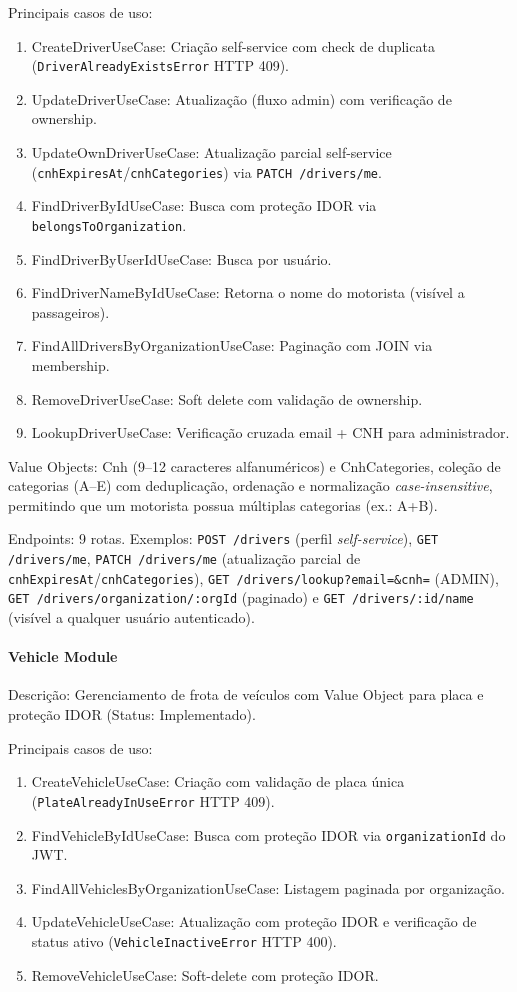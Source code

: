Principais casos de uso:
\begin{enumerate}
\item CreateDriverUseCase: Criação self-service com check de duplicata (\texttt{DriverAlreadyExistsError} HTTP 409).
\item UpdateDriverUseCase: Atualização (fluxo admin) com verificação de ownership.
\item UpdateOwnDriverUseCase: Atualização parcial self-service (\texttt{cnhExpiresAt}/\texttt{cnhCategories}) via \texttt{PATCH /drivers/me}.
\item FindDriverByIdUseCase: Busca com proteção IDOR via \texttt{belongsToOrganization}.
\item FindDriverByUserIdUseCase: Busca por usuário.
\item FindDriverNameByIdUseCase: Retorna o nome do motorista (visível a passageiros).
\item FindAllDriversByOrganizationUseCase: Paginação com JOIN via membership.
\item RemoveDriverUseCase: Soft delete com validação de ownership.
\item LookupDriverUseCase: Verificação cruzada email + CNH para administrador.
\end{enumerate}

Value Objects: Cnh (9--12 caracteres alfanuméricos) e CnhCategories, coleção de categorias (A--E) com deduplicação, ordenação e normalização \textit{case-insensitive}, permitindo que um motorista possua múltiplas categorias (ex.: A+B).

Endpoints: 9 rotas. Exemplos: \texttt{POST /drivers} (perfil \textit{self-service}), \texttt{GET /drivers/me}, \texttt{PATCH /drivers/me} (atualização parcial de \texttt{cnhExpiresAt}/\texttt{cnhCategories}), \texttt{GET /drivers/lookup?email=\&cnh=} (ADMIN), \texttt{GET /drivers/organization/:orgId} (paginado) e \texttt{GET /drivers/:id/name} (visível a qualquer usuário autenticado).

\paragraph{Vehicle Module}

Descrição: Gerenciamento de frota de veículos com Value Object para placa e proteção IDOR (Status: Implementado).

Principais casos de uso:
\begin{enumerate}
\item CreateVehicleUseCase: Criação com validação de placa única (\texttt{PlateAlreadyInUseError} HTTP 409).
\item FindVehicleByIdUseCase: Busca com proteção IDOR via \texttt{organizationId} do JWT.
\item FindAllVehiclesByOrganizationUseCase: Listagem paginada por organização.
\item UpdateVehicleUseCase: Atualização com proteção IDOR e verificação de status ativo (\texttt{VehicleInactiveError} HTTP 400).
\item RemoveVehicleUseCase: Soft-delete com proteção IDOR.
\end{enumerate}

